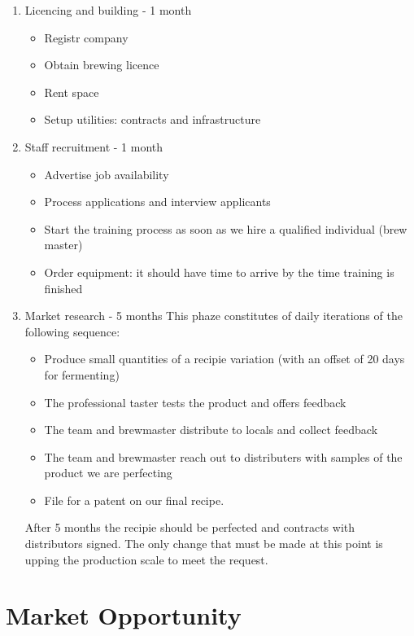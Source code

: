 \documentclass[11pt]{article}
\begin{document}
  \begin{enumerate}
  \item Licencing and building - 1 month \\
    \begin{itemize}
    \item Registr company
    \item Obtain brewing licence
    \item Rent space
    \item Setup utilities: contracts and infrastructure
  \end{itemize}

  \item Staff recruitment - 1 month
    \begin{itemize}
    \item Advertise job availability
    \item Process applications and interview applicants
    \item Start the training process as soon as we hire a qualified individual (brew master)
    \item Order equipment: it should have time to arrive by the time training is finished
    \end{itemize}

  \item Market research - 5 months
This phaze constitutes of daily iterations of the following sequence:
\begin{itemize}
\item Produce small quantities of a recipie variation (with an offset of 20 days for fermenting)
\item The professional taster tests the product and offers feedback
\item The team and brewmaster distribute to locals and collect feedback
\item The team and brewmaster reach out to distributers with samples of the product we are perfecting
\item File for a patent on our final recipe. 
\end{itemize}
\noindent After 5 months the recipie should be perfected and contracts with distributors signed. The only change that must be made at this point is upping the production scale to meet the request.
  \end{enumerate}
\section{Market Opportunity}
\end{document}
